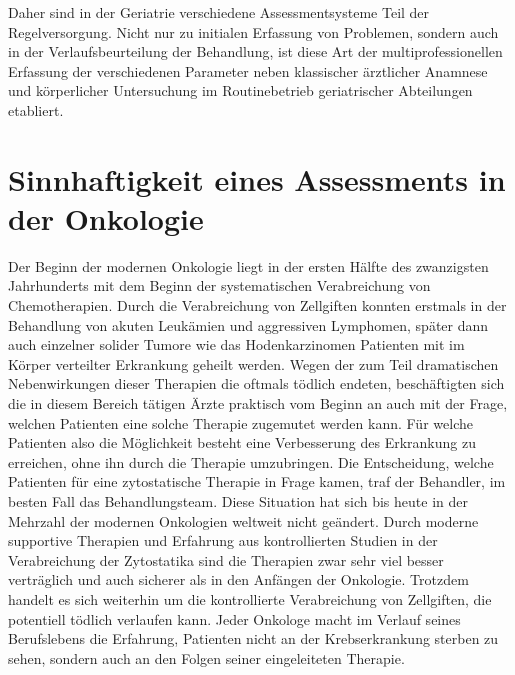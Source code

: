 Daher sind in der Geriatrie verschiedene Assessmentsysteme Teil der
Regelversorgung. Nicht nur zu initialen Erfassung von Problemen,
sondern auch in der Verlaufsbeurteilung der Behandlung, ist diese Art
der multiprofessionellen Erfassung der verschiedenen Parameter neben
klassischer ärztlicher Anamnese und körperlicher Untersuchung im
Routinebetrieb geriatrischer Abteilungen etabliert.

\section{Sinnhaftigkeit eines Assessments in der Onkologie}

Der Beginn der modernen Onkologie liegt in der ersten Hälfte des zwanzigsten Jahrhunderts mit dem Beginn der systematischen Verabreichung von Chemotherapien.  Durch die Verabreichung von Zellgiften konnten erstmals in der Behandlung von akuten Leukämien und aggressiven Lymphomen, später dann auch einzelner solider Tumore wie das Hodenkarzinomen Patienten mit im Körper verteilter Erkrankung geheilt werden. Wegen der zum Teil dramatischen Nebenwirkungen dieser Therapien die oftmals tödlich endeten, beschäftigten sich die in diesem Bereich tätigen Ärzte praktisch vom Beginn an auch mit der Frage, welchen Patienten eine solche Therapie zugemutet werden kann. Für welche Patienten also die Möglichkeit besteht eine Verbesserung des Erkrankung zu erreichen, ohne ihn durch die Therapie umzubringen. Die Entscheidung, welche Patienten für eine zytostatische Therapie in Frage kamen, traf der Behandler, im besten Fall das Behandlungsteam.
Diese Situation hat sich bis heute in der Mehrzahl der modernen Onkologien weltweit nicht geändert. Durch moderne supportive Therapien und Erfahrung aus kontrollierten Studien in der Verabreichung der Zytostatika sind die Therapien zwar sehr viel besser verträglich und auch sicherer als in den Anfängen der Onkologie. Trotzdem handelt es sich weiterhin um die kontrollierte Verabreichung von Zellgiften, die potentiell tödlich verlaufen kann. Jeder Onkologe macht im Verlauf seines Berufslebens die Erfahrung, Patienten nicht an der Krebserkrankung sterben zu sehen, sondern auch an den Folgen seiner eingeleiteten Therapie.

